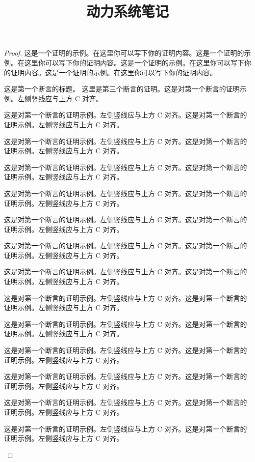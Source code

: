 \documentclass[lang=cn,a4paper,11pt,openany,scheme=chinese,twoside]{elegantbook}
\begin{document}
\title{动力系统笔记}
\date{}
\maketitle


\begin{proof}
这是一个证明的示例。在这里你可以写下你的证明内容。这是一个证明的示例。在这里你可以写下你的证明内容。这是一个证明的示例。在这里你可以写下你的证明内容。这是一个证明的示例。在这里你可以写下你的证明内容。

\begin{claim}{这是第一个断言的标题。}
  这里是第三个断言的证明。这是对第一个断言的证明示例。左侧竖线应与上方 C 对齐。 \par
这是对第一个断言的证明示例。左侧竖线应与上方 C 对齐。这是对第一个断言的证明示例。左侧竖线应与上方 C 对齐。 \par
这是对第一个断言的证明示例。左侧竖线应与上方 C 对齐。这是对第一个断言的证明示例。左侧竖线应与上方 C 对齐。 \par
这是对第一个断言的证明示例。左侧竖线应与上方 C 对齐。这是对第一个断言的证明示例。左侧竖线应与上方 C 对齐。 \par
这是对第一个断言的证明示例。左侧竖线应与上方 C 对齐。这是对第一个断言的证明示例。左侧竖线应与上方 C 对齐。 \par
这是对第一个断言的证明示例。左侧竖线应与上方 C 对齐。这是对第一个断言的证明示例。左侧竖线应与上方 C 对齐。 \par
这是对第一个断言的证明示例。左侧竖线应与上方 C 对齐。这是对第一个断言的证明示例。左侧竖线应与上方 C 对齐。 \par
这是对第一个断言的证明示例。左侧竖线应与上方 C 对齐。这是对第一个断言的证明示例。左侧竖线应与上方 C 对齐。 \par
这是对第一个断言的证明示例。左侧竖线应与上方 C 对齐。这是对第一个断言的证明示例。左侧竖线应与上方 C 对齐。 \par
这是对第一个断言的证明示例。左侧竖线应与上方 C 对齐。这是对第一个断言的证明示例。左侧竖线应与上方 C 对齐。 \par
这是对第一个断言的证明示例。左侧竖线应与上方 C 对齐。这是对第一个断言的证明示例。左侧竖线应与上方 C 对齐。 \par
这是对第一个断言的证明示例。左侧竖线应与上方 C 对齐。这是对第一个断言的证明示例。左侧竖线应与上方 C 对齐。 \par
这是对第一个断言的证明示例。左侧竖线应与上方 C 对齐。这是对第一个断言的证明示例。左侧竖线应与上方 C 对齐。 \par
这是对第一个断言的证明示例。左侧竖线应与上方 C 对齐。这是对第一个断言的证明示例。左侧竖线应与上方 C 对齐。 \par

\end{claim}
\end{proof}
\end{document}
